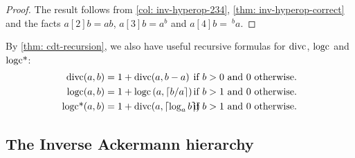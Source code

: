 \begin{proof}
	The result follows from \eqref{col: inv-hyperop-234}, \eqref{thm: inv-hyperop-correct} and the facts $a[2]b = ab$, $a[3]b = a^b$ and {\color{magenta}$a[4]b = \ ^ba$}.
\end{proof}
\begin{rem}
	{\color{magenta}By \eqref{thm: cdt-recursion}, we also have useful recursive formulas for $\text{divc}$, $\text{logc}$ and $\text{logc*}$:}
	\begin{align*}
	\divc(a, b) & = 1 + \divc(a, b - a) &\hspace{-20pt} \text{ if } b > 0 &\text{ and } 0 \text{ otherwise}. \\
	\logc(a, b) & = 1 + \logc\left(a, \left\lceil b/a \right\rceil\right) &\hspace{-20pt} \text{ if } b > 1 &\text{ and } 0 \text{ otherwise}. \\
	\logstarc(a, b) & = 1 + \divc(a, \left\lceil \log_ab \right\rceil) &\hspace{-20pt} \text{ if } b > 1 &\text{ and } 0 \text{ otherwise}.
	\end{align*}
\end{rem}

\subsection{The Inverse Ackermann hierarchy}

